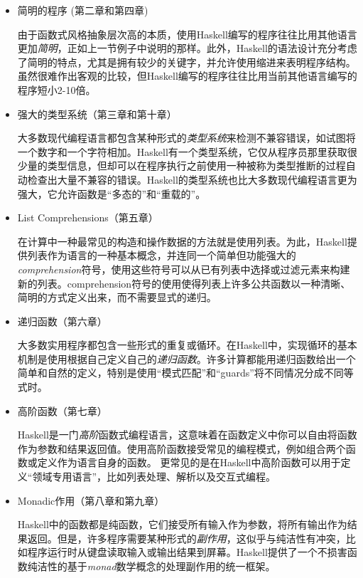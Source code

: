 \begin{itemize}
\item 简明的程序 (第二章和第四章)

由于函数式风格抽象层次高的本质，使用Haskell编写的程序往往比用其他语言更加\textit{简明}，正如上一节例子中说明的那样。此外，Haskell的语法设计充分考虑了简明的特点，尤其是拥有较少的关键字，并允许使用缩进来表明程序结构。虽然很难作出客观的比较，但Haskell编写的程序往往比用当前其他语言编写的程序短小2-10倍。

\item 强大的类型系统（第三章和第十章）

大多数现代编程语言都包含某种形式的\textit{类型系统}来检测不兼容错误，如试图将一个数字和一个字符相加。Haskell有一个类型系统，它仅从程序员那里获取很少量的类型信息，但却可以在程序执行之前使用一种被称为类型推断的过程自动检查出大量不兼容的错误。Haskell的类型系统也比大多数现代编程语言更为强大，它允许函数是“多态的”和“重载的”。

\item List Comprehensions（第五章）

在计算中一种最常见的构造和操作数据的方法就是使用列表。为此，Haskell提供列表作为语言的一种基本概念，并连同一个简单但功能强大的\textit{comprehension}符号，使用这些符号可以从已有列表中选择或过滤元素来构建新的列表。comprehension符号的使用使得列表上许多公共函数以一种清晰、简明的方式定义出来，而不需要显式的递归。

\item 递归函数（第六章）

大多数实用程序都包含一些形式的重复或循环。在Haskell中，实现循环的基本机制是使用根据自己定义自己的\textit{递归函数}。许多计算都能用递归函数给出一个简单和自然的定义，特别是使用“模式匹配”和“guards”将不同情况分成不同等式时。

\item 高阶函数（第七章）

Haskell是一门\textit{高阶}函数式编程语言，这意味着在函数定义中你可以自由将函数作为参数和结果返回值。使用高阶函数接受常见的编程模式，例如组合两个函数或定义作为语言自身的函数。
更常见的是在Haskell中高阶函数可以用于定义“领域专用语言”，比如列表处理、解析以及交互式编程。

\item Monadic作用（第八章和第九章）

Haskell中的函数都是纯函数，它们接受所有输入作为参数，将所有输出作为结果返回。但是，许多程序需要某种形式的\textit{副作用}，这似乎与纯洁性有冲突，比如程序运行时从键盘读取输入或输出结果到屏幕。Haskell提供了一个不损害函数纯洁性的基于\textit{monad}数学概念的处理副作用的统一框架。


\end{itemize}
